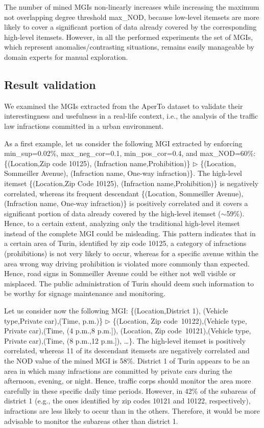 \documentclass[10pt, conference, compsocconf]{IEEEtran}
\begin{document}
The number of mined MGIs non-linearly increases while increasing the maximum not overlapping degree threshold max\_NOD, because low-level itemsets are more likely to cover a significant portion of data already covered by the corresponding high-level itemsets. 
However, in all the performed experiments the set of MGIs, which represent anomalies/contrasting situations, remains easily manageable by domain experts for manual exploration. 

\subsection{Result validation}
\label{validation}

We examined the MGIs extracted from the AperTo dataset to validate their interestingness and usefulness in a real-life context, 
i.e., the analysis of the traffic law infractions committed in a urban environment.

As a first example, let us consider the following MGI extracted by enforcing min\_sup=0.02\%, max\_neg\_cor=0.1, min\_pos\_cor=0.4, and max\_NOD=60\%:
\{(Location,Zip code 10125), (Infraction name,Prohibition)\} $\triangleright$ \{(Location, Sommeiller Avenue), (Infraction name, One-way infraction)\}.
The high-level itemset \{(Location,Zip Code 10125), (Infraction name,Prohibition)\} is negatively correlated, whereas its frequent descendant \{(Location, Sommeiller Avenue), (Infraction name, One-way infraction)\} is positively correlated
and it covers a significant portion of data already covered by the high-level itemset ($\sim$59\%). Hence, to a certain extent, analyzing only 
the traditional high-level itemset instead of the complete MGI could be misleading.
This pattern indicates that in a certain area of Turin, identified by zip code 10125, a category of infractions (prohibitions) is not very likely to occur, 
whereas for a specific avenue within the area wrong way driving prohibition is violated more commonly than expected. Hence, road signs in Sommeiller Avenue could be either not well visible or misplaced. 
The public administration of Turin should deem such information to be worthy for signage maintenance and monitoring.

Let us consider now the following MGI: \{(Location,District 1), (Vehicle type,Private car),(Time, p.m.)\} $\triangleright$ \{(Location, Zip code~10122),(Vehicle type, Private car),(Time, (4 p.m.,8 p.m.]), (Location, Zip code~10121),(Vehicle type, Private car),(Time, (8 p.m.,12 p.m.]), \dots \}.
The high-level itemset is positively correlated, whereas 11 of its descendant itemsets are negatively correlated and the NOD value of the mined MGI is 58\%.
District 1 of Turin appears to be an area in which many infractions are committed by private cars during the afternoon, evening, or night. Hence, traffic corps should monitor the area more carefully in these specific daily time periods.
However, in 42\% of the subareas of district 1 (e.g., the ones identified by zip codes 10121 and 10122, respectively), infractions are less likely to occur than in the others. 
Therefore, it would be more advisable to monitor the subareas other than district 1. 
\end{document}
